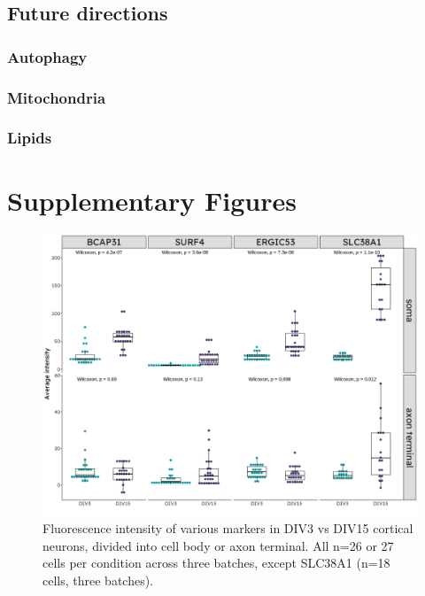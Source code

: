 \documentclass[
  12pt,
  a4paper,
]{book}
\begin{document}
\hypertarget{future-directions}{%
\section{Future directions}\label{future-directions}}

\hypertarget{autophagy}{%
\subsection{Autophagy}\label{autophagy}}

\hypertarget{mitochondria-1}{%
\subsection{Mitochondria}\label{mitochondria-1}}

\hypertarget{lipids}{%
\subsection{Lipids}\label{lipids}}

\hypertarget{SUPPLEMENT}{%
\chapter*{Supplementary Figures}\label{SUPPLEMENT}}


\begin{figure}
\includegraphics{../figures/full/suppl-dev-grid-1} \caption[Supplementary figure; marker intensity in cell bodies and axon terminals of developing cortical neurons]{Fluorescence intensity of various markers in DIV3 vs DIV15 cortical neurons, divided into cell body or axon terminal.  All n=26 or 27 cells per condition across three batches, except SLC38A1 (n=18 cells, three batches).}\label{fig:suppl-dev-grid}
\end{figure}
\end{document}
